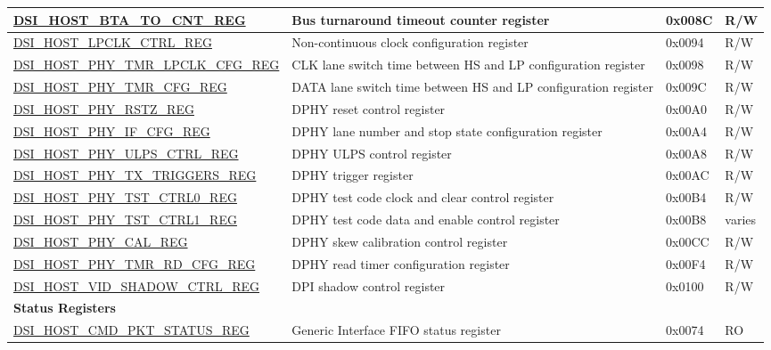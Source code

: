 \begin{longtable}{ | p{6.8cm} | p{6.5cm} | p{1.2cm} | p{1cm} | }
\hyperref[regdesc:DSIHOSTBTATOCNTREG]{DSI\_HOST\_BTA\_TO\_CNT\_REG} & Bus turnaround timeout counter register & 0x008C & R/W \\ \hline
\hyperref[regdesc:DSIHOSTLPCLKCTRLREG]{DSI\_HOST\_LPCLK\_CTRL\_REG} & Non-continuous clock configuration register & 0x0094 & R/W \\ \hline
\hyperref[regdesc:DSIHOSTPHYTMRLPCLKCFGREG]{DSI\_HOST\_PHY\_TMR\_LPCLK\_CFG\_REG} & CLK lane switch time between HS and LP configuration register & 0x0098 & R/W \\ \hline
\hyperref[regdesc:DSIHOSTPHYTMRCFGREG]{DSI\_HOST\_PHY\_TMR\_CFG\_REG} & DATA lane switch time between HS and LP configuration register & 0x009C & R/W \\ \hline
\hyperref[regdesc:DSIHOSTPHYRSTZREG]{DSI\_HOST\_PHY\_RSTZ\_REG} & DPHY reset control register & 0x00A0 & R/W \\ \hline
\hyperref[regdesc:DSIHOSTPHYIFCFGREG]{DSI\_HOST\_PHY\_IF\_CFG\_REG} & DPHY lane number and stop state configuration register & 0x00A4 & R/W \\ \hline
\hyperref[regdesc:DSIHOSTPHYULPSCTRLREG]{DSI\_HOST\_PHY\_ULPS\_CTRL\_REG} & DPHY ULPS control register & 0x00A8 & R/W \\ \hline
\hyperref[regdesc:DSIHOSTPHYTXTRIGGERSREG]{DSI\_HOST\_PHY\_TX\_TRIGGERS\_REG} & DPHY trigger register & 0x00AC & R/W \\ \hline
\hyperref[regdesc:DSIHOSTPHYTSTCTRL0REG]{DSI\_HOST\_PHY\_TST\_CTRL0\_REG} & DPHY test code clock and clear control register & 0x00B4 & R/W \\ \hline
\hyperref[regdesc:DSIHOSTPHYTSTCTRL1REG]{DSI\_HOST\_PHY\_TST\_CTRL1\_REG} & DPHY test code data and enable control register & 0x00B8 & varies \\ \hline
\hyperref[regdesc:DSIHOSTPHYCALREG]{DSI\_HOST\_PHY\_CAL\_REG} & DPHY skew calibration control register & 0x00CC & R/W \\ \hline
\hyperref[regdesc:DSIHOSTPHYTMRRDCFGREG]{DSI\_HOST\_PHY\_TMR\_RD\_CFG\_REG} & DPHY read timer configuration register & 0x00F4 & R/W \\ \hline
\hyperref[regdesc:DSIHOSTVIDSHADOWCTRLREG]{DSI\_HOST\_VID\_SHADOW\_CTRL\_REG} & DPI shadow control register & 0x0100 & R/W \\ \hline
\multicolumn{4}{|l|}{\textbf{Status Registers}} \\ \hline
\hyperref[regdesc:DSIHOSTCMDPKTSTATUSREG]{DSI\_HOST\_CMD\_PKT\_STATUS\_REG} & Generic Interface FIFO status register & 0x0074 & RO \\ \hline

\end{longtable}
